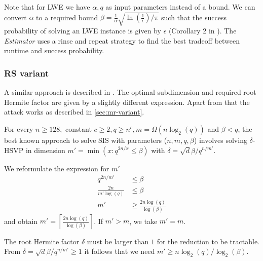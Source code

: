 Note that for LWE we have $\alpha, q$ as input parameters instead of a bound. We can convert $\alpha$ to a required bound $\beta = \frac{1}{\alpha} \sqrt{\ln (\frac{1}{\epsilon})/ \pi}$ such that the success probability of solving an LWE instance is given by $\epsilon$ (Corollary 2 in \cite{APS15}). The \textit{Estimator} uses a rinse and repeat strategy to find the best tradeoff between runtime and success probability.






\subsubsection{RS variant \cite{RS10}}

A similar approach is described in \cite{RS10}. The optimal subdimension and required root Hermite factor are given by a slightly different expression. Apart from that the attack works as described in \cref{sec:mr-variant}.

\begin{theorem}
  For every $n \geq 128,$ constant $c \geq 2, q \geq n^c, m = \Omega(n \log_2(q))$ and $\beta < q$, the best known approach to solve SIS with parameters ($n, m, q, \beta$) involves solving $\delta$-HSVP in dimension $m' = \min(x : q^{2n/x} \leq \beta)$ with $\delta = \sqrt{d}{\beta / q^{n/m'}}$.
\end{theorem}

We reformulate the expression for $m'$
\begin{align}
  q^{2n / m'}           & \leq \beta                          \\
  \frac{2n}{m' \log(q)} & \leq \beta                          \\
  m'                    & \geq \frac{2n \log(q)}{\log(\beta)}
\end{align}
and obtain $m' = \left\lceil \frac{2n \log(q)}{\log(\beta)} \right\rceil$. If $m' > m$, we take $m' = m$.

The root Hermite factor $\delta$ must be larger than $1$ for the reduction to be tractable. From $\delta = \sqrt{d}{\beta / q^{n/m'}} \geq 1$ it follows that we need $m' \geq n \log_2(q) / \log_2(\beta)$.



